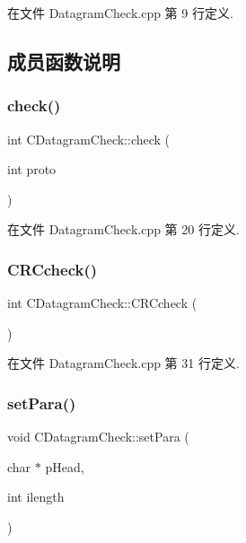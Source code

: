 在文件 Datagram\+Check.\+cpp 第 9 行定义.



\subsection{成员函数说明}
\mbox{\label{class_c_datagram_check_a9f21ffeb4696f31eb8af68b09cf17686}} 
\subsubsection{\texorpdfstring{check()}{check()}}
{\footnotesize\ttfamily int C\+Datagram\+Check\+::check (\begin{DoxyParamCaption}\item[{int}]{proto }\end{DoxyParamCaption})}



在文件 Datagram\+Check.\+cpp 第 20 行定义.

\mbox{\label{class_c_datagram_check_af7314fcfc87618386920fcb567f6f5d7}} 
\subsubsection{\texorpdfstring{C\+R\+Ccheck()}{CRCcheck()}}
{\footnotesize\ttfamily int C\+Datagram\+Check\+::\+C\+R\+Ccheck (\begin{DoxyParamCaption}{ }\end{DoxyParamCaption})\hspace{0.3cm}{\ttfamily [protected]}}



在文件 Datagram\+Check.\+cpp 第 31 行定义.

\mbox{\label{class_c_datagram_check_ac607f6742d36faec27f6462aefb6abaf}} 
\subsubsection{\texorpdfstring{set\+Para()}{setPara()}}
{\footnotesize\ttfamily void C\+Datagram\+Check\+::set\+Para (\begin{DoxyParamCaption}\item[{char $\ast$}]{p\+Head,  }\item[{int}]{ilength }\end{DoxyParamCaption})}



